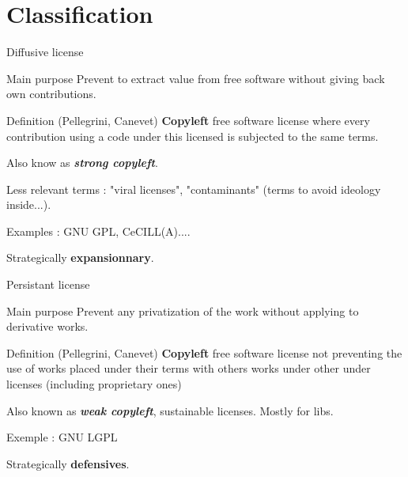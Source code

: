 \documentclass{beamer}
\begin{document}

\section{Classification}

\begin{frame}{Diffusive license}

  \begin{block}{Main purpose}
    Prevent to extract value from free software without giving back own contributions.
  \end{block}

  \begin{alertblock}{Definition (Pellegrini, Canevet)}
    \textbf{Copyleft} free software license where every contribution using a code under this licensed is subjected to the same terms.
   \end{alertblock}

Also know as \textit{\textbf{strong copyleft}}.

Less relevant terms : "viral licenses", "contaminants" (terms to avoid  ideology inside...).
  
Examples : GNU GPL, CeCILL(A)....

Strategically \textbf{expansionnary}.
\end{frame}


\begin{frame}{Persistant license}

\begin{block}{Main purpose}
    Prevent any privatization of the work without applying to derivative works.
  \end{block}

  \begin{alertblock}{Definition (Pellegrini, Canevet)}
    \textbf{Copyleft} free software license not preventing the use of works placed under their terms with others works under other under licenses (including proprietary ones)
   \end{alertblock}

Also known as \textit{\textbf{weak copyleft}}, sustainable licenses. Mostly for libs.
 
Exemple : GNU LGPL

Strategically \textbf{defensives}.

\end{frame}
\end{document}
